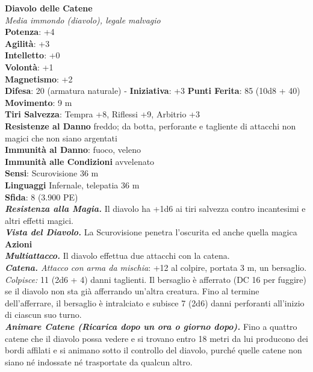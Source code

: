 \begin{multicols}{2}
\medskip\textbf{Diavolo delle Catene}\\
\emph{Media immondo (diavolo), legale malvagio}\\
\textbf{Potenza}: +4\\
\textbf{Agilità}: +3\\
\textbf{Intelletto}: +0\\
\textbf{Volontà}: +1\\
\textbf{Magnetismo}: +2\\
\textbf{Difesa}: 20 (armatura naturale) - \textbf{Iniziativa}: +3
\textbf{Punti Ferita}: 85 (10d8 + 40)\\
\textbf{Movimento}: 9 m\\
\textbf{Tiri Salvezza}: Tempra +8, Riflessi +9, Arbitrio +3\\
\textbf{Resistenze al Danno} freddo; da botta, perforante e tagliente di attacchi non magici che non siano argentati\\
\textbf{Immunità al Danno}: fuoco, veleno\\
\textbf{Immunità alle Condizioni} avvelenato\\
\textbf{Sensi}: Scurovisione 36 m\\
\textbf{Linguaggi} Infernale, telepatia 36 m \\
\textbf{Sfida}: 8 (3.900 PE)\smallskip\\
\emph{\textbf{Resistenza alla Magia.}} Il diavolo ha +1d6 ai tiri salvezza contro incantesimi e altri effetti magici.\\
\emph{\textbf{Vista del Diavolo.}} La Scurovisione penetra l'oscurita ed anche quella magica\\
\smallskip\textbf{Azioni}\\
\emph{\textbf{Multiattacco.}} Il diavolo effettua due attacchi con la catena.\\
\emph{\textbf{Catena.} Attacco con arma da mischia}: +12 al colpire, portata 3 m, un bersaglio.\\
\emph{Colpisce:} 11 (2d6 + 4) danni taglienti. Il bersaglio è afferrato (DC  16 per fuggire) se il diavolo non sta già afferrando un'altra creatura. Fino al termine dell'afferrare, il bersaglio è intralciato e subisce 7 (2d6) danni perforanti all'inizio di ciascun suo turno.\\
\emph{\textbf{Animare Catene (Ricarica dopo un ora o giorno dopo).}} Fino a quattro catene che il diavolo possa vedere e si trovano entro 18 metri da lui producono dei bordi affilati e si animano sotto il controllo del diavolo, purché quelle catene non siano né indossate né trasportate da qualcun altro.\\

\end{multicols}
